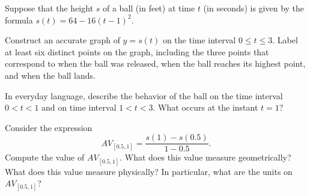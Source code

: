 \begin{pa} \label{PA:0.2}
Suppose that the height $s$ of a ball (in feet) at time $t$ (in seconds) is given by the formula $s(t) = 64 - 16(t-1)^2$.  
\ba
\item Construct an accurate graph of $y = s(t)$ on the time interval $0 \le t \le 3$.  Label at least six distinct points on the graph, including the three points that correspond to when the ball was released, when the ball reaches its highest point, and when the ball lands.

\item In everyday language, describe the behavior of the ball on the time interval $0 < t < 1$ and on time interval $1 < t < 3$.  What occurs at the instant $t = 1$?

\item Consider the expression 
\[ AV_{[0.5,1]} = \frac{s(1) - s(0.5)}{1-0.5}. \]
Compute the value of $AV_{[0.5,1]}$.  What does this value measure geometrically?  What does this value measure physically?  In particular, what are the units on $AV_{[0.5,1]}$?
\ea
\end{pa} \afterpa